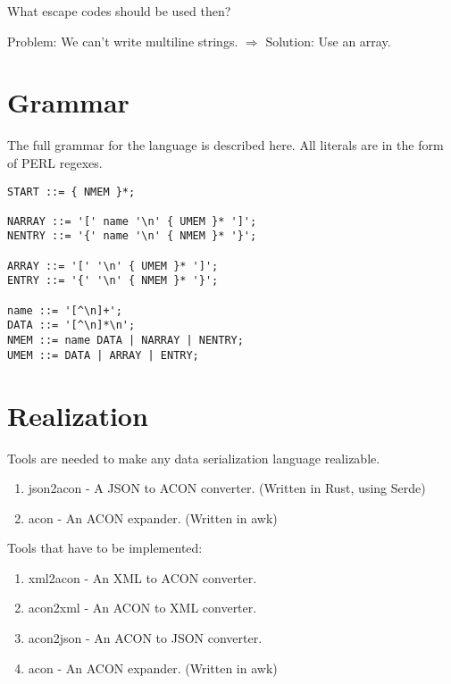 \documentclass[listof=totoc]{article}
\begin{document}
What escape codes should be used then?

Problem: We can't write multiline strings.
$\Rightarrow$ Solution: Use an array.

\section{Grammar}
The full grammar for the language is described here. All literals are in the form of PERL regexes.

\begin{verbatim}
START ::= { NMEM }*;

NARRAY ::= '[' name '\n' { UMEM }* ']';
NENTRY ::= '{' name '\n' { NMEM }* '}';

ARRAY ::= '[' '\n' { UMEM }* ']';
ENTRY ::= '{' '\n' { NMEM }* '}';

name ::= '[^\n]+';
DATA ::= '[^\n]*\n';
NMEM ::= name DATA | NARRAY | NENTRY;
UMEM ::= DATA | ARRAY | ENTRY;
\end{verbatim}

\section{Realization}
Tools are needed to make any data serialization language realizable.

\begin{enumerate}
	\item json2acon - A JSON to ACON converter. (Written in Rust, using Serde)
	\item acon - An ACON expander. (Written in awk)
\end{enumerate}

Tools that have to be implemented:
\begin{enumerate}
	\item xml2acon - An XML to ACON converter.
	\item acon2xml - An ACON to XML converter.
	\item acon2json - An ACON to JSON converter.
	\item acon - An ACON expander. (Written in awk)
\end{enumerate}


\lstlistoflistings



\end{document}
